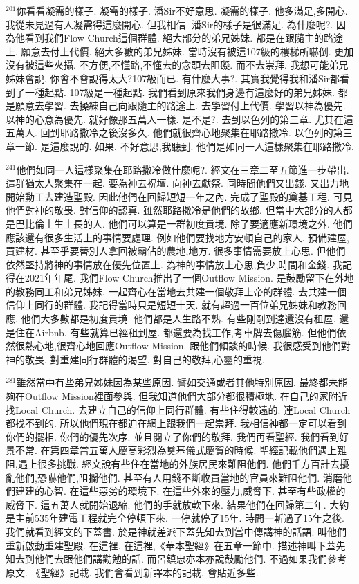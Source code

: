 \documentclass{book}
\begin{document}
$^{201}$你看看凝需的樣子.
凝需的樣子.
潘Sir不好意思.
凝需的樣子.
他多滿足,多開心.
我從未見過有人凝需得這麼開心.
但我相信.
潘Sir的樣子是很滿足.
為什麼呢?.
因為他看到我們Flow Church這個群體.
絕大部分的弟兄姊妹.
都是在跟隨主的路途上.
願意去付上代價.
絕大多數的弟兄姊妹.
當時沒有被這107級的樓梯所嚇倒.
更加沒有被這些夾攝.
不方便,不懂路,不懂去的念頭去阻礙.
而不去崇拜.
我想可能弟兄姊妹會說.
你會不會說得太大?107級而已.
有什麼大事?.
其實我覺得我和潘Sir都看到了一種起點.
107級是一種起點.
我們看到原來我們身邊有這麼好的弟兄姊妹.
都是願意去學習.
去操練自己向跟隨主的路途上.
去學習付上代價.
學習以神為優先.
以神的心意為優先.
就好像那五萬人一樣.
是不是?.
去到以色列的第三章.
尤其在這五萬人.
回到耶路撒冷之後沒多久.
他們就很齊心地聚集在耶路撒冷.
以色列的第三章一節.
是這麼說的.
如果.
不好意思,我聽到.
他們是如同一人這樣聚集在耶路撒冷.

$^{241}$他們如同一人這樣聚集在耶路撒冷做什麼呢?.
經文在三章二至五節進一步帶出.
這群猶太人聚集在一起.
要為神去祝壇.
向神去獻祭.
同時間他們又出錢.
又出力地開始動工去建造聖殿.
因此他們在回歸短短一年之內.
完成了聖殿的奠基工程.
可見他們對神的敬畏.
對信仰的認真.
雖然耶路撒冷是他們的故鄉.
但當中大部分的人都是巴比倫土生土長的人.
他們可以算是一群初度貴境.
除了要適應新環境之外.
他們應該還有很多生活上的事情要處理.
例如他們要找地方安頓自己的家人.
預備建屋,買建材.
甚至乎要替別人拿回被霸佔的農地,地方.
很多事情需要放上心思.
但他們依然堅持將神的事情放在優先位置上.
為神的事情放上心思,負少,時間和金錢.
我記得在2021年年尾.
我們Flow Church推出了一個Outflow Mission.
是鼓勵留下在外地的教務同工和弟兄姊妹.
一起齊心在當地去共建一個敬拜上帝的群體.
去共建一個信仰上同行的群體.
我記得當時只是短短十天.
就有超過一百位弟兄姊妹和教務回應.
他們大多數都是初度貴境.
他們都是人生路不熟.
有些剛剛到達還沒有租屋.
還是住在Airbnb.
有些就算已經租到屋.
都還要為找工作,考車牌去傷腦筋.
但他們依然很熱心地,很齊心地回應Outflow Mission.
跟他們傾談的時候.
我很感受到他們對神的敬畏.
對重建同行群體的渴望.
對自己的敬拜,心靈的重視.

$^{281}$雖然當中有些弟兄姊妹因為某些原因.
譬如交通或者其他特別原因.
最終都未能夠在Outflow Mission裡面參與.
但我知道他們大部分都很積極地.
在自己的家附近找Local Church.
去建立自己的信仰上同行群體.
有些住得較遠的.
連Local Church都找不到的.
所以他們現在都迫在網上跟我們一起崇拜.
我相信神都一定可以看到你們的擺相.
你們的優先次序.
並且閱立了你們的敬拜.
我們再看聖經.
我們看到好景不常.
在第四章當五萬人慶高彩烈為奠基儀式慶賀的時候.
聖經記載他們遇上難阻,遇上很多挑戰.
經文說有些住在當地的外族居民來難阻他們.
他們千方百計去擾亂他們,恐嚇他們,阻攔他們.
甚至有人用錢不斷收買當地的官員來難阻他們.
消磨他們建建的心智.
在這些惡劣的環境下.
在這些外來的壓力,威脅下.
甚至有些政權的威脅下.
這五萬人就開始退縮.
他們的手就放軟下來.
結果他們在回歸第二年.
大約是主前535年建電工程就完全停頓下來.
一停就停了15年.
時間一斬過了15年之後.
我們就看到經文的下蓋書.
於是神就差派下蓋先知去到當中傳講神的話語.
叫他們重新啟動重建聖殿.
在這裡.
在這裡,《華本聖經》在五章一節中.
描述神叫下蓋先知去到他們去跟他們講勸勉的話.
而呂鎮忠亦本亦說鼓勵他們.
不過如果我們參考原文.
《聖經》記載.
我們會看到新譯本的記載.
會貼近多些.
\end{document}
